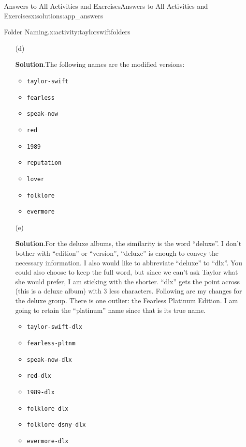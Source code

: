 \documentclass[oneside,10pt,]{book}
\newcommand{\blocktitlefont}{\relax}
\newcommand{\mono}[1]{\texttt{#1}}
\begin{document}
\begin{solutions-chapter}{Answers to All Activities and Exercises}{}{Answers to All Activities and Exercises}{}{}{x:solutions:app_answers}
\begin{activitysolution}{1.1}{Folder Naming.}{x:activity:taylorswiftfolders}
\begin{enumerate}[font=\bfseries,label=(\alph*),ref=\alph*]
\item[(d)]\par\smallskip%
\noindent\textbf{\blocktitlefont Solution}.\hypertarget{g:solution:idm481059688-back}{}\quad{}The following names are the modified versions:%
\begin{multicols}{2}
\begin{itemize}[label=\textbullet]
\item{}\mono{taylor-swift}%
\item{}\mono{fearless}%
\item{}\mono{speak-now}%
\item{}\mono{red}%
\item{}\mono{1989}%
\item{}\mono{reputation}%
\item{}\mono{lover}%
\item{}\mono{folklore}%
\item{}\mono{evermore}%
\end{itemize}
\end{multicols}
%
\item[(e)]\par\smallskip%
\noindent\textbf{\blocktitlefont Solution}.\hypertarget{g:solution:idm480995656-back}{}\quad{}For the deluxe albums, the similarity is the word ``deluxe''. I don't bother with ``edition'' or ``version'', ``deluxe'' is enough to convey the necessary information. I also would like to abbreviate ``deluxe'' to ``dlx''. You could also choose to keep the full word, but since we can't ask Taylor what she would prefer, I am sticking with the shorter. ``dlx'' gets the point across (this is a deluxe album) with 3 less characters. Following are my changes for the deluxe group. There is one outlier: the Fearless Platinum Edition. I am going to retain the ``platinum'' name since that is its true name.%
\begin{multicols}{2}
\begin{itemize}[label=\textbullet]
\item{}\mono{taylor-swift-dlx}%
\item{}\mono{fearless-pltnm}%
\item{}\mono{speak-now-dlx}%
\item{}\mono{red-dlx}%
\item{}\mono{1989-dlx}%
\item{}\mono{folklore-dlx}%
\item{}\mono{folklore-dsny-dlx}%
\item{}\mono{evermore-dlx}%
\end{itemize}

\end{multicols}
\end{enumerate}
\end{activitysolution}
\end{solutions-chapter}
\end{document}
